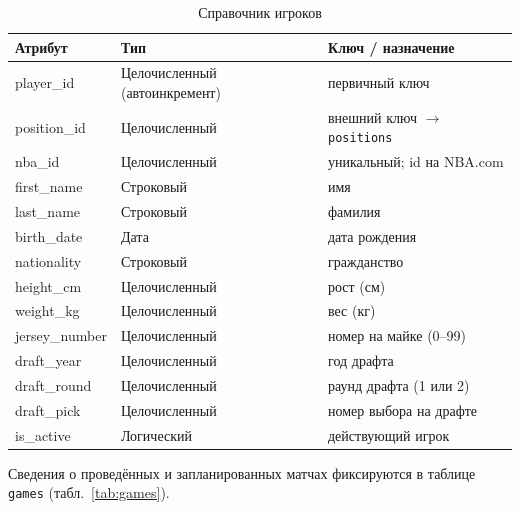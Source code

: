 {\begin{table}[H]
\caption{Справочник игроков}
\label{tab:players}
\centering
\begin{tabular}{|p{}|p{}|p{}|}
\hline
\textbf{Атрибут} & \textbf{Тип} & \textbf{Ключ / назначение} \\
\hline
player\_id & Целочисленный (автоинкремент) & первичный ключ \\
\hline
position\_id & Целочисленный & внешний ключ $\rightarrow$ \texttt{positions} \\
\hline
nba\_id & Целочисленный & уникальный; id на NBA.com \\
\hline
first\_name & Строковый & имя \\
\hline
last\_name & Строковый & фамилия \\
\hline
birth\_date & Дата & дата рождения \\
\hline
nationality & Строковый & гражданство \\
\hline
height\_cm & Целочисленный & рост (см) \\
\hline
weight\_kg & Целочисленный & вес (кг) \\
\hline
jersey\_number & Целочисленный & номер на майке (0--99) \\
\hline
draft\_year & Целочисленный & год драфта \\
\hline
draft\_round & Целочисленный & раунд драфта (1 или 2) \\
\hline
draft\_pick & Целочисленный & номер выбора на драфте \\
\hline
is\_active & Логический & действующий игрок \\
\hline
\end{tabular}
\end{table}

{\normalsize
Сведения о проведённых и запланированных матчах фиксируются в таблице
\texttt{games} (табл.~\ref{tab:games}).
}

}
